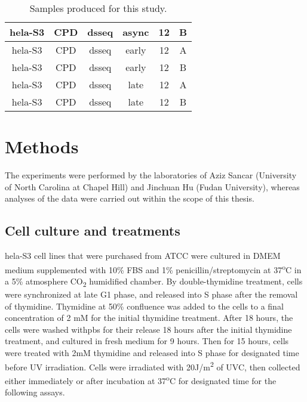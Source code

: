 \begin{table}[H]
\begin{adjustbox}{max width=\textwidth}
\begin{tabular}{cccccc}
    \gls{hela}-S3           & \gls{CPD}              & \gls{dsseq}     & async            & 12            & B                  \\ \hline 
    \gls{hela}-S3           & \gls{CPD}              & \gls{dsseq}     & early            & 12            & A                  \\ \hline 
    \gls{hela}-S3           & \gls{CPD}              & \gls{dsseq}     & early            & 12            & B                  \\ \hline 
    \gls{hela}-S3           & \gls{CPD}              & \gls{dsseq}     & late             & 12            & A                  \\ \hline 
    \gls{hela}-S3           & \gls{CPD}              & \gls{dsseq}     & late             & 12            & B \\
    \hline                
    \end{tabular}
    \end{adjustbox}
    \caption{Samples produced for this study.}
    \label{tab:samples}
    \end{table}

\section{Methods}

The experiments were performed by the laboratories of Aziz Sancar (University of North Carolina at Chapel Hill) and Jinchuan Hu (Fudan University), whereas analyses of the data were carried out within the scope of this thesis. 

\subsection{Cell culture and treatments}
\gls{hela}-S3 cell lines that were purchased from ATCC were cultured in DMEM medium supplemented with 10\% FBS and 1\% penicillin/streptomycin at 37\textsuperscript{o}C in a 5\% atmosphere CO\textsubscript{2} humidified chamber. By double-thymidine treatment, cells were synchronized at late G1 phase, and released into S phase after the removal of thymidine. Thymidine at 50\% confluence was added to the cells to a final concentration of 2 mM for the initial thymidine treatment. After 18 hours, the cells were washed with\gls{pbs} for their release 18 hours after the initial thymidine treatment, and cultured in fresh medium for 9 hours. Then for 15 hours, cells were treated with 2mM thymidine and released into S phase for designated time before UV irradiation. Cells were irradiated with 20J/m\textsuperscript{2} of UVC, then collected either immediately or after incubation at 37\textsuperscript{o}C for designated time for the following assays.

